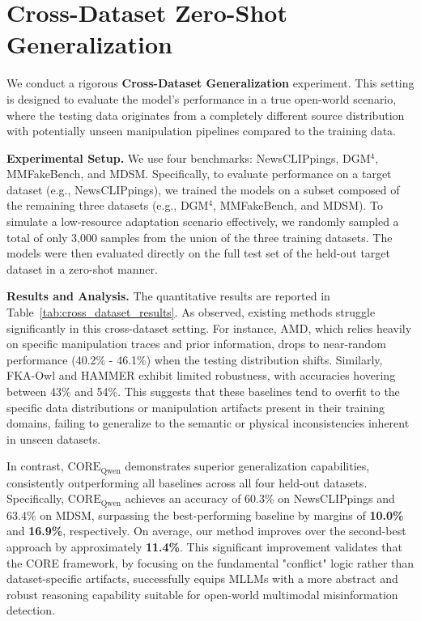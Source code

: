\documentclass{article}
\theoremstyle{plain}
\theoremstyle{definition}
\theoremstyle{remark}
\begin{document}
\section{Cross-Dataset Zero-Shot Generalization}
\label{sec:appendix_cross_dataset}

We conduct a rigorous \textbf{Cross-Dataset Generalization} experiment. This setting is designed to evaluate the model's performance in a true open-world scenario, where the testing data originates from a completely different source distribution with potentially unseen manipulation pipelines compared to the training data.

\textbf{Experimental Setup.} We use four benchmarks: NewsCLIPpings, DGM$^4$, MMFakeBench, and MDSM.
Specifically, to evaluate performance on a target dataset (e.g., NewsCLIPpings), we trained the models on a subset composed of the remaining three datasets (e.g., DGM$^4$, MMFakeBench, and MDSM). To simulate a low-resource adaptation scenario effectively, we randomly sampled a total of only 3,000 samples from the union of the three training datasets. The models were then evaluated directly on the full test set of the held-out target dataset in a zero-shot manner.

\textbf{Results and Analysis.} The quantitative results are reported in Table~\ref{tab:cross_dataset_results}.
As observed, existing methods struggle significantly in this cross-dataset setting. For instance, AMD, which relies heavily on specific manipulation traces and prior information, drops to near-random performance (40.2\% - 46.1\%) when the testing distribution shifts. Similarly, FKA-Owl and HAMMER exhibit limited robustness, with accuracies hovering between 43\% and 54\%. This suggests that these baselines tend to overfit to the specific data distributions or manipulation artifacts present in their training domains, failing to generalize to the semantic or physical inconsistencies inherent in unseen datasets.

In contrast, $\text{CORE}_\text{Qwen}$ demonstrates superior generalization capabilities, consistently outperforming all baselines across all four held-out datasets. 
Specifically, $\text{CORE}_\text{Qwen}$ achieves an accuracy of 60.3\% on NewsCLIPpings and 63.4\% on MDSM, surpassing the best-performing baseline by margins of \textbf{10.0\%} and \textbf{16.9\%}, respectively.
On average, our method improves over the second-best approach by approximately \textbf{11.4\%}. 
This significant improvement validates that the CORE framework, by focusing on the fundamental "conflict" logic rather than dataset-specific artifacts, successfully equips MLLMs with a more abstract and robust reasoning capability suitable for open-world multimodal misinformation detection.
\end{document}
